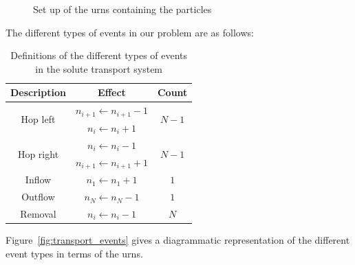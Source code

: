 \begin{figure}[ht!]
    \centering
    {
    }
    \caption{\label{fig:urns}Set up of the urns containing the particles}
\end{figure}

The different types of events in our problem are as follows:
\begin{table}[ht!]
    \centering
    \begin{tabular}{ c | c | c }
        Description & Effect & Count \\ \hline\hline
        \multirow{2}{*}{Hop left} & \(n_{i+1} \leftarrow n_{i+1} - 1\) & \multirow{2}{*}{\(N-1\)} \\ & \(n_i \leftarrow n_i + 1\) \\ \hline
        \multirow{2}{*}{Hop right} & \(n_i \leftarrow n_i - 1\) & \multirow{2}{*}{\(N-1\)} \\ & \(n_{i+1} \leftarrow n_{i+1} + 1\) \\ \hline
        Inflow & \(n_1 \leftarrow n_1 + 1\) & \(1\) \\ \hline
        Outflow & \(n_N \leftarrow n_N - 1\) & \(1\) \\ \hline
        Removal & \(n_i \leftarrow n_i - 1\) & \(N\) \\
    \end{tabular}
    \caption{\label{tab:generic_transport_events}Definitions of the different types of
events in the solute transport system}
\end{table}

Figure~\ref{fig:transport_events} gives a diagrammatic representation of the
different event types in terms of the urns.

